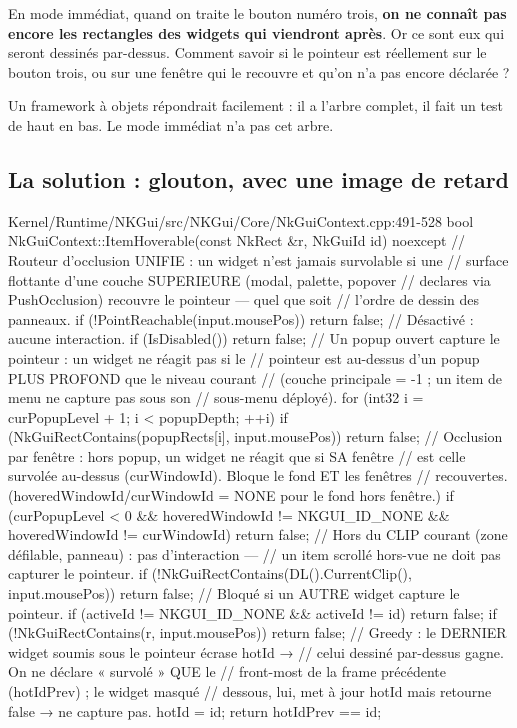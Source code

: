 En mode immédiat, quand on traite le bouton numéro trois, \textbf{on ne connaît
pas encore les rectangles des widgets qui viendront après}. Or ce sont eux qui
seront dessinés par-dessus. Comment savoir si le pointeur est réellement sur le
bouton trois, ou sur une fenêtre qui le recouvre et qu'on n'a pas encore
déclarée ?

Un framework à objets répondrait facilement : il a l'arbre complet, il fait un
test de haut en bas. Le mode immédiat n'a pas cet arbre.

\subsection{La solution : glouton, avec une image de retard}

\begin{nkcode}{Kernel/Runtime/NKGui/src/NKGui/Core/NkGuiContext.cpp:491-528}
bool NkGuiContext::ItemHoverable(const NkRect &r, NkGuiId id) noexcept {
    // Routeur d'occlusion UNIFIE : un widget n'est jamais survolable si une
    // surface flottante d'une couche SUPERIEURE (modal, palette, popover
    // declares via PushOcclusion) recouvre le pointeur — quel que soit
    // l'ordre de dessin des panneaux.
    if (!PointReachable(input.mousePos)) return false;
    // Désactivé : aucune interaction.
    if (IsDisabled()) return false;
    // Un popup ouvert capture le pointeur : un widget ne réagit pas si le
    // pointeur est au-dessus d'un popup PLUS PROFOND que le niveau courant
    // (couche principale = -1 ; un item de menu ne capture pas sous son
    // sous-menu déployé).
    for (int32 i = curPopupLevel + 1; i < popupDepth; ++i)
        if (NkGuiRectContains(popupRects[i], input.mousePos)) return false;
    // Occlusion par fenêtre : hors popup, un widget ne réagit que si SA fenêtre
    // est celle survolée au-dessus (curWindowId). Bloque le fond ET les fenêtres
    // recouvertes. (hoveredWindowId/curWindowId = NONE pour le fond hors fenêtre.)
    if (curPopupLevel < 0 && hoveredWindowId != NKGUI_ID_NONE && hoveredWindowId != curWindowId)
        return false;
    // Hors du CLIP courant (zone défilable, panneau) : pas d'interaction —
    // un item scrollé hors-vue ne doit pas capturer le pointeur.
    if (!NkGuiRectContains(DL().CurrentClip(), input.mousePos)) return false;
    // Bloqué si un AUTRE widget capture le pointeur.
    if (activeId != NKGUI_ID_NONE && activeId != id) return false;
    if (!NkGuiRectContains(r, input.mousePos)) return false;
    // Greedy : le DERNIER widget soumis sous le pointeur écrase hotId →
    // celui dessiné par-dessus gagne. On ne déclare « survolé » QUE le
    // front-most de la frame précédente (hotIdPrev) ; le widget masqué
    // dessous, lui, met à jour hotId mais retourne false → ne capture pas.
    hotId = id;
    return hotIdPrev == id;
}
\end{nkcode}


